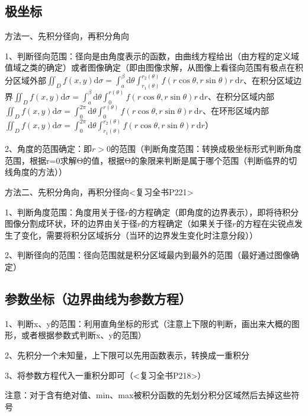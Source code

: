 \subsection{极坐标}

方法一、先积分径向，再积分角向

1、判断径向范围：径向是由角度表示的函数，由曲线方程给出（由方程的定义域值域之类的确定）或者图像确定（即由图像求解，从图像上看径向范围有极点在积分区域外部$\iint_{D} f(x, y) \mathrm{d} \sigma=\int_{a}^{\beta} \mathrm{d} \theta \int_{r_{1}(\theta)}^{r_{2}(\theta)} f(r \cos \theta, r \sin \theta) r \mathrm{~d} r$、在积分区域边界$\iint_{D} f(x, y) \mathrm{d} \sigma=\int_{a}^{\beta} \mathrm{d} \theta \int_{0}^{r(\theta)} f(r \cos \theta, r \sin \theta) r \mathrm{~d} r$、在积分区域内部$\iint_{D} f(x, y) \mathrm{d} \sigma=\int_{0}^{2 \pi} \mathrm{d} \theta \int_{0}^{r(\theta)} f(r \cos \theta, r \sin \theta) r \mathrm{~d} r$、在环形区域内部$\iint_{D} f(x, y) \mathrm{d} \sigma=\int_{0}^{2 \pi} \mathrm{d} \theta \int_{r_{1}(\theta)}^{r_{2}(\theta)} f(r \cos \theta, r \sin \theta) r \mathrm{~d} r$）

2、角度的范围确定：即$r > 0 $的范围（判断角度范围：转换成极坐标形式判断角度范围，根据r=0求解Θ的值，根据Θ的象限来判断是属于哪个范围（判断临界的切线角度的方法））

方法二、先积分角向，再积分径向<复习全书P221>

1、判断角度范围：角度用关于径$r$的方程确定（即角度的边界表示），即将待积分图像分割成环状，环的边界由关于径$r$的方程确定（如果关于径$r$的方程在尖锐点发生了变化，需要将积分区域拆分（当环的边界发生变化时注意分段））

2、判断径向的范围：径向范围就是积分区域最内到最外的范围（最好通过图像确定）



\subsection{参数坐标（边界曲线为参数方程）}

1、判断x、y的范围：利用直角坐标的形式（注意上下限的判断，画出来大概的图形，或者根据参数式判断x、y的范围）

2、先积分一个未知量，上下限可以先用函数表示，转换成一重积分

3、将参数方程代入一重积分即可（<复习全书P218>）



注意：对于含有绝对值、min、max被积分函数的先划分积分区域然后去掉这些符号

